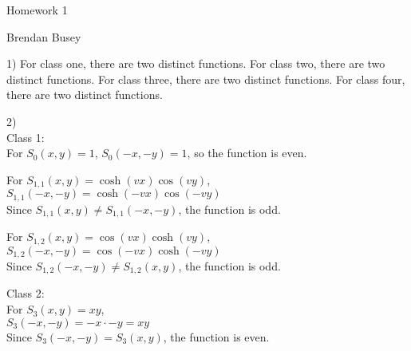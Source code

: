 \documentclass[12pt, executivepaper]{article}
\begin{document}
\begin{center}

\large{Homework 1}

\end{center}

\begin{flushright}

Brendan Busey

\end{flushright}

\begin{flushleft}

1) For class one, there are two distinct functions.
For class two, there are two distinct functions.
For class three, there are two distinct functions.
For class four, there are two distinct functions.

\vspace{5mm}

2) \\
Class 1: \\
For $S_{0}(x,y)=1$,
$S_{0}(-x,-y)=1$, so the function is even. \\

\vspace{3mm}

For $S_{1,1}(x,y)=\cosh(vx)\cos(vy)$, \\

$S_{1,1}(-x,-y)=\cosh(-vx)\cos(-vy)$ \\

Since $S_{1,1}(x,y) \neq S_{1,1}(-x,-y)$, the function is odd.

\vspace{3mm}

For $S_{1,2}(x,y)=\cos(vx)\cosh(vy)$, \\

$S_{1,2}(-x,-y)=\cos(-vx)\cosh(-vy)$ \\

Since $S_{1,2}(-x,-y) \neq S_{1,2}(x,y)$, the function is odd. \\

\vspace{3mm}

Class 2: \\
For $S_{3}(x,y)=xy$, \\

$S_{3}(-x, -y)=-x \cdot -y=xy$ \\

Since $S_{3}(-x,-y)=S_{3}(x,y)$, the function is even. \\


\end{flushleft}
\end{document}
